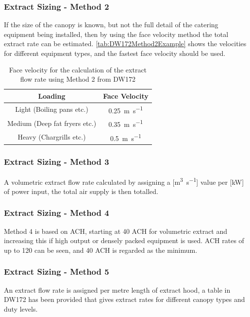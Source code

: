 \subsubsection{Extract Sizing - Method 2}

If the size of the canopy is known, but not the full detail of the catering equipment being installed, then by using the face velocity method the total extract rate can be estimated.  \autoref{tab:DW172Method2Example} shows the velocities for different equipment types, and the fastest face velocity should be used.

\begin{table}[H]
\centering
\begin{tabular}{cc}
\hline
Loading & Face Velocity\\
\hline
Light (Boiling pans etc.) & 0.25~\si{\metre\per\second}\\
Medium (Deep fat fryers etc.) & 0.35~\si{\metre\per\second}\\
Heavy (Chargrills etc.) & 0.5~\si{\metre\per\second}\\
\hline
\end{tabular}
\caption{Face velocity for the calculation of the extract flow rate using Method 2 from DW172}
\label{tab:DW172Method2Example}
\end{table}

\begin{table}
\centering

\end{table}

\subsubsection{Extract Sizing - Method 3}

A volumetric extract flow rate calculated by assigning a [\si{\cubic\metre\per\second}] value per [\si{\kilo\watt}] of power input, the total air supply is then totalled.

\subsubsection{Extract Sizing - Method 4}

Method 4 is based on \gls{ACH}, starting at 40 ACH for volumetric extract and increasing this if high output or densely packed equipment is used.  ACH rates of up to 120 can be seen, and 40 ACH is regarded as the minimum.

\subsubsection{Extract Sizing - Method 5}

An extract flow rate is assigned per metre length of extract hood, a table in DW172 has been provided that gives extract rates for different canopy types and duty levels.